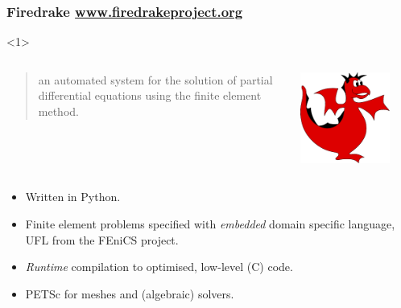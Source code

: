 \documentclass[presentation, 10pt]{beamer}
\begin{document}
\begin{frame}[t]
  \frametitle{Firedrake \url{www.firedrakeproject.org}}

  \begin{overlayarea}{\textwidth}{\textheight}
    \begin{onlyenv}<1>
  \begin{columns}
    \begin{column}{0.8\textwidth}
      \begin{quote}
        {\normalfont [\ldots]} an automated system for the solution of
        partial differential equations using the finite element
        method.
      \end{quote}
    \end{column}
    \begin{column}{0.2\textwidth}
      \includegraphics[width=0.8\textwidth]{firedrake-small}
    \end{column}
  \end{columns}
      \begin{itemize}
      \item Written in Python.
      \item Finite element problems specified with \emph{embedded}
        domain specific language, UFL \parencite{Alnaes:2014} from the
        FEniCS project.
      \item \emph{Runtime} compilation to optimised, low-level (C)
        code.
      \item PETSc for meshes and (algebraic) solvers.
      \end{itemize}


\end{onlyenv}
\end{overlayarea}
\end{frame}
\end{document}

